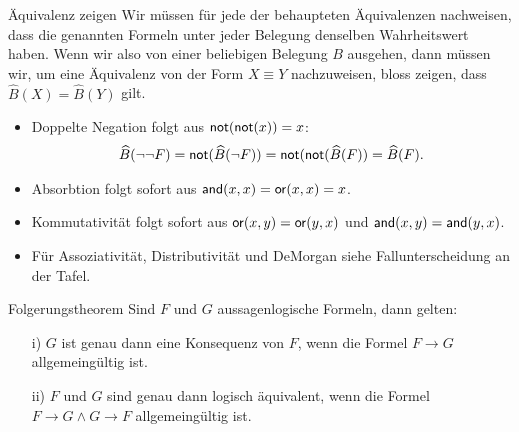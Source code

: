 \begin{howto}{Äquivalenz zeigen}
    Wir müssen für jede der behaupteten Äquivalenzen nachweisen, dass die genannten Formeln unter jeder Belegung denselben Wahrheitswert haben. Wenn wir also von einer beliebigen Belegung $B$ ausgehen, dann müssen wir, um eine Äquivalenz von der Form $X\equiv Y$ nachzuweisen, bloss zeigen, dass $\widehat{B}(X)=\widehat{B}(Y)$ gilt.
    \begin{itemize}
        \item Doppelte Negation folgt aus $\mathsf{not}(\mathsf{not}(x))=x$:
        \begin{align*}
        \widehat{B}(\neg\neg F)=\mathsf{not}(\widehat{B}(\neg F))=\mathsf{not}(\mathsf{not}(\widehat{B}(F))=\widehat{B}(F).
        \end{align*}
        \item Absorbtion folgt sofort aus $\mathsf{and}(x,x)=\mathsf{or}(x,x) =x$.
        \item Kommutativität folgt sofort aus $\mathsf{or}(x,y)=\mathsf{or}(y,x)$ und $\mathsf{and}(x,y)=\mathsf{and}(y,x)$.
        \item Für Assoziativität, Distributivität und DeMorgan siehe Fallunterscheidung an der Tafel.
    \end{itemize}
\end{howto}

\begin{comment}
Das nächste Theorem schlägt eine wichtige Brücke zwischen Syntax und Semantik der Aussagenlogik, indem es die logische Konsequenz (Semantik) in Beziehung zur Implikation
(Syntax) setzt. Man kann das Theorem dahingehend interpretieren, dass die Implikation~$\to$ eine adäquate Formalisierung des Folgerungsbegriffes $\Rightarrow$ vom ersten Kapitel darstellt.
\end{comment}

\begin{theorem}{Folgerungstheorem}
    Sind $F$ und $G$ aussagenlogische Formeln, dann gelten:
    \begin{enumerate}
        \item[i)] $G$ ist genau dann eine Konsequenz von $F$, wenn die Formel $F\to G$ allgemeingültig ist.
        \item[ii)] $F$ und $G$ sind genau dann logisch äquivalent, wenn die Formel $F\to G\land G\to F$ allgemeingültig ist.
    \end{enumerate}
\end{theorem}

